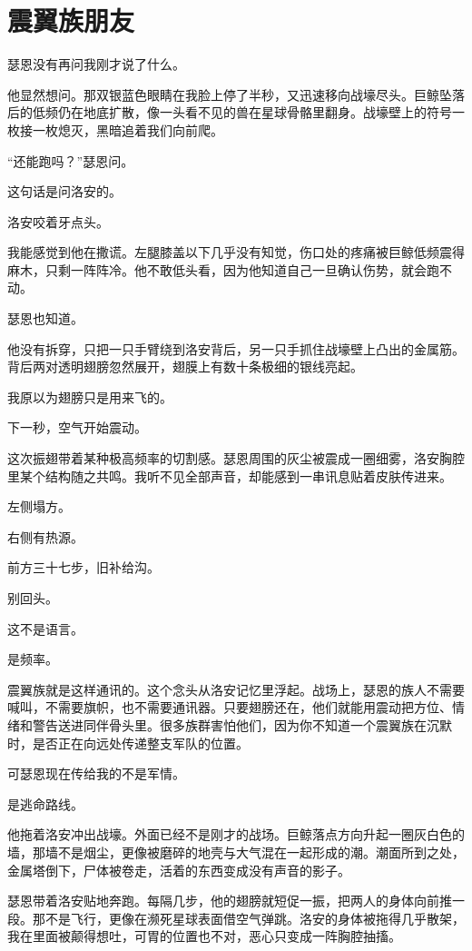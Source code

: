 \chapter{震翼族朋友}

瑟恩没有再问我刚才说了什么。

他显然想问。那双银蓝色眼睛在我脸上停了半秒，又迅速移向战壕尽头。巨鲸坠落后的低频仍在地底扩散，像一头看不见的兽在星球骨骼里翻身。战壕壁上的符号一枚接一枚熄灭，黑暗追着我们向前爬。

“还能跑吗？”瑟恩问。

这句话是问洛安的。

洛安咬着牙点头。

我能感觉到他在撒谎。左腿膝盖以下几乎没有知觉，伤口处的疼痛被巨鲸低频震得麻木，只剩一阵阵冷。他不敢低头看，因为他知道自己一旦确认伤势，就会跑不动。

瑟恩也知道。

他没有拆穿，只把一只手臂绕到洛安背后，另一只手抓住战壕壁上凸出的金属筋。背后两对透明翅膀忽然展开，翅膜上有数十条极细的银线亮起。

我原以为翅膀只是用来飞的。

下一秒，空气开始震动。

这次振翅带着某种极高频率的切割感。瑟恩周围的灰尘被震成一圈细雾，洛安胸腔里某个结构随之共鸣。我听不见全部声音，却能感到一串讯息贴着皮肤传进来。

左侧塌方。

右侧有热源。

前方三十七步，旧补给沟。

别回头。

这不是语言。

是频率。

震翼族就是这样通讯的。这个念头从洛安记忆里浮起。战场上，瑟恩的族人不需要喊叫，不需要旗帜，也不需要通讯器。只要翅膀还在，他们就能用震动把方位、情绪和警告送进同伴骨头里。很多族群害怕他们，因为你不知道一个震翼族在沉默时，是否正在向远处传递整支军队的位置。

可瑟恩现在传给我的不是军情。

是逃命路线。

他拖着洛安冲出战壕。外面已经不是刚才的战场。巨鲸落点方向升起一圈灰白色的墙，那墙不是烟尘，更像被磨碎的地壳与大气混在一起形成的潮。潮面所到之处，金属塔倒下，尸体被卷走，活着的东西变成没有声音的影子。

瑟恩带着洛安贴地奔跑。每隔几步，他的翅膀就短促一振，把两人的身体向前推一段。那不是飞行，更像在濒死星球表面借空气弹跳。洛安的身体被拖得几乎散架，我在里面被颠得想吐，可胃的位置也不对，恶心只变成一阵胸腔抽搐。

